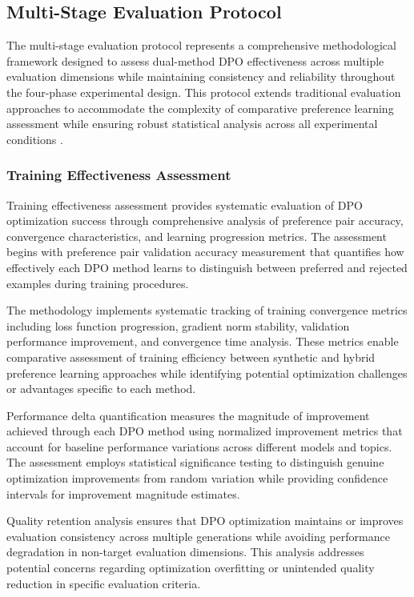 \subsection{Multi-Stage Evaluation Protocol}
\label{sec:multi-stage-evaluation}

The multi-stage evaluation protocol represents a comprehensive methodological framework designed to assess dual-method DPO effectiveness across multiple evaluation dimensions while maintaining consistency and reliability throughout the four-phase experimental design. This protocol extends traditional evaluation approaches to accommodate the complexity of comparative preference learning assessment while ensuring robust statistical analysis across all experimental conditions \cite{chen2024meta_evaluation, xu2024consistency_survey}.

\subsubsection{Training Effectiveness Assessment}

Training effectiveness assessment provides systematic evaluation of DPO optimization success through comprehensive analysis of preference pair accuracy, convergence characteristics, and learning progression metrics. The assessment begins with preference pair validation accuracy measurement that quantifies how effectively each DPO method learns to distinguish between preferred and rejected examples during training procedures.

The methodology implements systematic tracking of training convergence metrics including loss function progression, gradient norm stability, validation performance improvement, and convergence time analysis. These metrics enable comparative assessment of training efficiency between synthetic and hybrid preference learning approaches while identifying potential optimization challenges or advantages specific to each method.

Performance delta quantification measures the magnitude of improvement achieved through each DPO method using normalized improvement metrics that account for baseline performance variations across different models and topics. The assessment employs statistical significance testing to distinguish genuine optimization improvements from random variation while providing confidence intervals for improvement magnitude estimates.

Quality retention analysis ensures that DPO optimization maintains or improves evaluation consistency across multiple generations while avoiding performance degradation in non-target evaluation dimensions. This analysis addresses potential concerns regarding optimization overfitting or unintended quality reduction in specific evaluation criteria.

